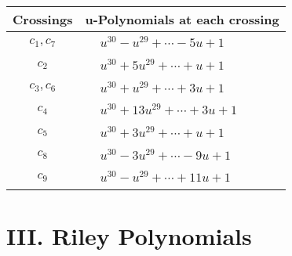 \documentclass[1p]{elsarticle_modified}
\theoremstyle{definition}
\begin{document}
\begin{tabular}{m{50pt}|m{274pt}}
Crossings & \hspace{64pt}u-Polynomials at each crossing \\
\hline $$\begin{aligned}c_{1},c_{7}\end{aligned}$$&$\begin{aligned}
&u^{30}- u^{29}+\cdots-5 u+1
\end{aligned}$\\
\hline $$\begin{aligned}c_{2}\end{aligned}$$&$\begin{aligned}
&u^{30}+5 u^{29}+\cdots+u+1
\end{aligned}$\\
\hline $$\begin{aligned}c_{3},c_{6}\end{aligned}$$&$\begin{aligned}
&u^{30}+u^{29}+\cdots+3 u+1
\end{aligned}$\\
\hline $$\begin{aligned}c_{4}\end{aligned}$$&$\begin{aligned}
&u^{30}+13 u^{29}+\cdots+3 u+1
\end{aligned}$\\
\hline $$\begin{aligned}c_{5}\end{aligned}$$&$\begin{aligned}
&u^{30}+3 u^{29}+\cdots+u+1
\end{aligned}$\\
\hline $$\begin{aligned}c_{8}\end{aligned}$$&$\begin{aligned}
&u^{30}-3 u^{29}+\cdots-9 u+1
\end{aligned}$\\
\hline $$\begin{aligned}c_{9}\end{aligned}$$&$\begin{aligned}
&u^{30}- u^{29}+\cdots+11 u+1
\end{aligned}$\\
\hline
\end{tabular}\newpage\renewcommand{\arraystretch}{1}
\centering \section*{ III. Riley Polynomials}
\end{document}
